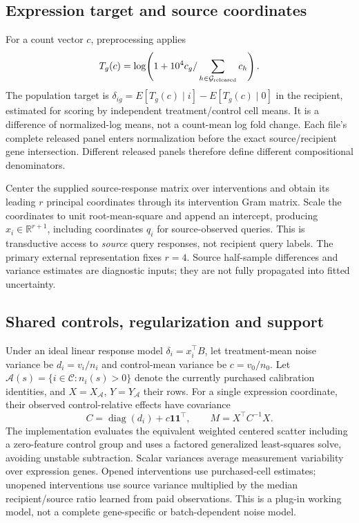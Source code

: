 \subsection{Expression target and source coordinates}
For a count vector $c$, preprocessing applies
\begin{equation}
 T_g(c)=\log\!\left(1+10^4c_g/\sum_{h\in\mathcal G_{\rm released}}c_h\right).
\end{equation}
The population target is $\delta_{ig}=E[T_g(c)\mid i]-E[T_g(c)\mid 0]$ in the recipient, estimated for scoring by independent treatment/control cell means. It is a difference of normalized-log means, not a count-mean log fold change. Each file's complete released panel enters normalization before the exact source/recipient gene intersection. Different released panels therefore define different compositional denominators.

Center the supplied source-response matrix over interventions and obtain its leading $r$ principal coordinates through its intervention Gram matrix. Scale the coordinates to unit root-mean-square and append an intercept, producing $x_i\in\mathbb R^{r+1}$, including coordinates $q_i$ for source-observed queries. This is transductive access to \emph{source} query responses, not recipient query labels. The primary external representation fixes $r=4$. Source half-sample differences and variance estimates are diagnostic inputs; they are not fully propagated into fitted uncertainty.

\subsection{Shared controls, regularization and support}
Under an ideal linear response model $\delta_i=x_i^\top B$, let treatment-mean noise variance be $d_i=v_i/n_i$ and control-mean variance be $c=v_0/n_0$. Let $\mathcal A(s)=\{i\in\mathcal C:n_i(s)>0\}$ denote the currently purchased calibration identities, and $X=X_{\mathcal A}$, $Y=Y_{\mathcal A}$ their rows. For a single expression coordinate, their observed control-relative effects have covariance
\begin{equation}
 C=\operatorname{diag}(d_i)+c\mathbf 1\mathbf 1^\top,
 \qquad M=X^\top C^{-1}X.
 \label{eq:cov}
\end{equation}
The implementation evaluates the equivalent weighted centered scatter including a zero-feature control group and uses a factored generalized least-squares solve, avoiding unstable subtraction. Scalar variances average measurement variability over expression genes. Opened interventions use purchased-cell estimates; unopened interventions use source variance multiplied by the median recipient/source ratio learned from paid observations. This is a plug-in working model, not a complete gene-specific or batch-dependent noise model.

